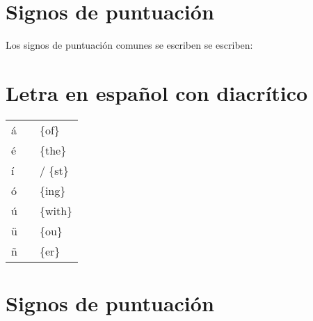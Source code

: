 \documentclass[draft]{article}
\newcommand{\mytildetable}[1]{%
	\enskip\begin{tabular}[t]{l|r|l} 
		\hline #1 \hline
	\end{tabular}\enskip}
\begin{document}
\section{Signos de puntuación}

Los signos de puntuación comunes se escriben se escriben:



\section{Letra en español con diacrítico}

\begin{center}
	\mytildetable{
		á &\braille{{of}}     & \{of\}      \\
		é &\braille{{the}}    & \{the\}     \\
		í &\braille{{st}}     & / \{st\}    \\
		ó &\braille{{ing}}    & \{ing\}     \\
		ú &\braille{{with}}   & \{with\}    \\
		ü & \braille{{ou}}    & \{ou\}     \\
		ñ & \braille{{er}}    & \{er\}     \\
	}
\end{center}




\section{Signos de puntuación}
\end{document}
